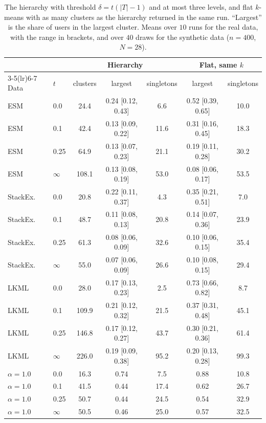 \begin{table}[h]
\centering
\caption{The hierarchy with threshold $\delta=t(|T|-1)$ and at most three levels, and flat $k$-means with as many clusters as the hierarchy returned in the same run. ``Largest'' is the share of users in the largest cluster. Means over $10$ runs for the real data, with the range in brackets, and over $40$ draws for the synthetic data ($n=400$, $N=28$).}\label{tab:equalk}
\setlength{\tabcolsep}{4pt}\small
\begin{tabular}{llccccc}
\toprule
& & \multicolumn{3}{c}{Hierarchy} & \multicolumn{2}{c}{Flat, same $k$} \\
\cmidrule(lr){3-5}\cmidrule(lr){6-7}
Data & $t$ & clusters & largest & singletons & largest & singletons \\
\midrule
ESM & 0.0 & 24.4 & 0.24 [0.12, 0.43] & 6.6 & 0.52 [0.39, 0.65] & 10.0 \\
ESM & 0.1 & 42.4 & 0.13 [0.09, 0.22] & 11.6 & 0.31 [0.16, 0.45] & 18.3 \\
ESM & 0.25 & 64.9 & 0.13 [0.07, 0.23] & 21.1 & 0.19 [0.11, 0.28] & 30.2 \\
ESM & $\infty$ & 108.1 & 0.13 [0.08, 0.19] & 53.0 & 0.08 [0.06, 0.17] & 53.5 \\
StackEx. & 0.0 & 20.8 & 0.22 [0.11, 0.37] & 4.3 & 0.35 [0.21, 0.51] & 7.0 \\
StackEx. & 0.1 & 48.7 & 0.11 [0.08, 0.13] & 20.8 & 0.14 [0.07, 0.36] & 23.9 \\
StackEx. & 0.25 & 61.3 & 0.08 [0.06, 0.09] & 32.6 & 0.10 [0.06, 0.15] & 35.4 \\
StackEx. & $\infty$ & 55.0 & 0.07 [0.06, 0.09] & 26.6 & 0.10 [0.08, 0.15] & 29.4 \\
LKML & 0.0 & 28.0 & 0.17 [0.13, 0.23] & 2.5 & 0.73 [0.66, 0.82] & 8.7 \\
LKML & 0.1 & 109.9 & 0.21 [0.12, 0.32] & 21.5 & 0.37 [0.31, 0.48] & 45.1 \\
LKML & 0.25 & 146.8 & 0.17 [0.12, 0.27] & 43.7 & 0.30 [0.21, 0.36] & 61.4 \\
LKML & $\infty$ & 226.0 & 0.19 [0.09, 0.38] & 95.2 & 0.20 [0.13, 0.28] & 99.3 \\
\midrule
$\alpha=1.0$ & 0.0 & 16.3 & 0.74 & 7.5 & 0.88 & 10.8 \\
$\alpha=1.0$ & 0.1 & 41.5 & 0.44 & 17.4 & 0.62 & 26.7 \\
$\alpha=1.0$ & 0.25 & 50.7 & 0.44 & 24.5 & 0.54 & 32.9 \\
$\alpha=1.0$ & $\infty$ & 50.5 & 0.46 & 25.0 & 0.57 & 32.5 \\

\end{tabular}
\end{table}
